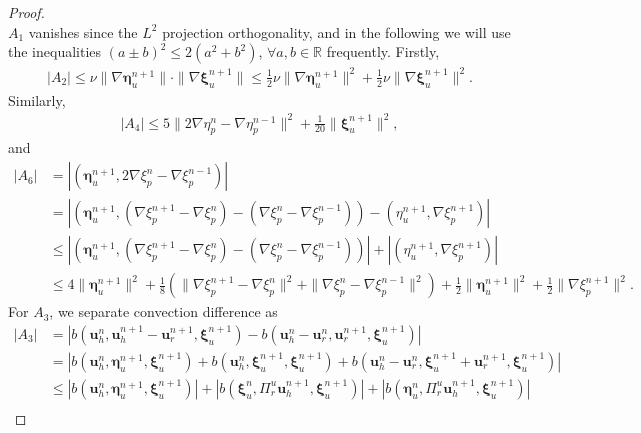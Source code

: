\documentclass[10pt,twoside,openany,UTF8,CJK]{article}
\begin{document}
\begin{proof}
\begin{equation}
    \end{equation}			
	$A_1$ vanishes since the $L^2$ projection orthogonality, and in the following we will use the inequalities $(a \pm b)^2 \leq 2(a^2 + b^2)$, $\forall a,b \in \mathbb{R}$ frequently. Firstly,
	$$
	\begin{aligned}
		|A_2| \leq \nu\|\nabla\boldsymbol{\eta}^{n+1}_u\|\cdot\|\nabla\boldsymbol{\xi}^{n+1}_u\| \leq \frac{1}{2}\nu\|\nabla\boldsymbol{\eta}^{n+1}_u\|^2 + \frac{1}{2}\nu\|\nabla\boldsymbol{\xi}^{n+1}_u\|^2.
	\end{aligned}
    $$
    Similarly,
    $$
    \begin{aligned}	
		|A_4| \leq 5\|2\nabla\eta^n_p-\nabla\eta^{n-1}_p\|^2 + \frac{1}{20}\|\boldsymbol{\xi}^{n+1}_u\|^2,
	\end{aligned}
    $$
    and
    $$
    \begin{aligned}	
		|A_6| &= |(\boldsymbol{\eta}^{n+1}_u, 2\nabla\xi^n_p-\nabla\xi^{n-1}_p)| \\
	    &= |(\boldsymbol{\eta}^{n+1}_u, (\nabla\xi^{n+1}_p-\nabla\xi^n_p)-(\nabla\xi^n_p-\nabla\xi^{n-1}_p)) - (\eta^{n+1}_u, \nabla\xi^{n+1}_p)| \\
	    &\leq |(\boldsymbol{\eta}^{n+1}_u, (\nabla\xi^{n+1}_p-\nabla\xi^n_p)-(\nabla\xi^n_p-\nabla\xi^{n-1}_p))| + |(\eta^{n+1}_u, \nabla\xi^{n+1}_p)| \\	
		&\leq 4\|\boldsymbol{\eta}^{n+1}_u\|^2 + \frac18(\|\nabla\xi^{n+1}_p-\nabla\xi^n_p\|^2 + \|\nabla\xi^n_p-\nabla\xi^{n-1}_p\|^2) + \frac{1}{2}\|\boldsymbol{\eta}^{n+1}_u\|^2 + \frac{1}{2}\|\nabla\xi^{n+1}_p\|^2.
    \end{aligned}
    $$		
	For $A_3$, we separate convection difference as
	$$
	\begin{aligned}
		|A_3| &= |b(\boldsymbol{u}^n_h,\boldsymbol{u}^{n+1}_h - \boldsymbol{u}^{n+1}_r, \boldsymbol{\xi}^{n+1}_u) - b(\boldsymbol{u}^n_h-\boldsymbol{u}^n_r,\boldsymbol{u}^{n+1}_r,\boldsymbol{\xi}^{n+1}_u)| \\
		&= |b(\boldsymbol{u}^n_h,\boldsymbol{\eta}^{n+1}_u, \boldsymbol{\xi}^{n+1}_u) + b(\boldsymbol{u}^n_h,\boldsymbol{\xi}^{n+1}_u, \boldsymbol{\xi}^{n+1}_u) + b(\boldsymbol{u}^n_h-\boldsymbol{u}^n_r,\boldsymbol{\xi}^{n+1}_u + \boldsymbol{u}^{n+1}_r, \boldsymbol{\xi}^{n+1}_u)| \\
		&\leq |b(\boldsymbol{u}^n_h,\boldsymbol{\eta}^{n+1}_u, \boldsymbol{\xi}^{n+1}_u)| + |b(\boldsymbol{\xi}^n_u,\Pi^u_r\boldsymbol{u}^{n+1}_h, \boldsymbol{\xi}^{n+1}_u)| + |b(\boldsymbol{\eta}^n_u,\Pi^u_r\boldsymbol{u}^{n+1}_h, \boldsymbol{\xi}^{n+1}_u)| \\

\end{aligned}$$
\end{proof}
\end{document}
